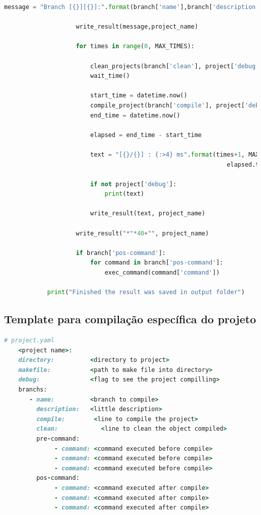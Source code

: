 \begin{apendicesenv}
\begin{lstlisting}[language=Python, caption={Script de Recompilações},
                  label=script_recompilacoes]
                    message = "Branch [{}][{}]:".format(branch['name'],branch['description'])

                    write_result(message,project_name)

                    for times in range(0, MAX_TIMES):

                        clean_projects(branch['clean'], project['debug'])
                        wait_time()

                        start_time = datetime.now()
                        compile_project(branch['compile'], project['debug'])
                        end_time = datetime.now()

                        elapsed = end_time - start_time

                        text = "[{}/{}] : {:>4} ms".format(times+1, MAX_TIMES,
                                                              elapsed.total_seconds())

                        if not project['debug']:
                            print(text)

                        write_result(text, project_name)

                    write_result("*"*40+"", project_name)

                    if branch['pos-command']:
                        for command in branch['pos-command']:
                            exec_command(command['command'])

            print("Finished the result was saved in output folder")
\end{lstlisting}

\subsection{Template para compilação específica do projeto}

\begin{lstlisting}[language=ruby, caption={Template para execução do Script de Recompilações},
                  label=template_para_script_recompilacoes]
	# project.yaml
    <project name>:
    directory:          <directory to project>
    makefile:           <path to make file into directory>
    debug:              <flag to see the project compilling>
    branchs:
       - name:          <branch to compile>
         description:   <little description>
         compile:        <line to compile the project>
         clean:            <line to clean the object compiled>
         pre-command:
              - command: <command executed before compile>
              - command: <command executed before compile>
              - command: <command executed before compile>
         pos-command:
              - command: <command executed after compile>
              - command: <command executed after compile>
              - command: <command executed after compile>
\end{lstlisting}


\end{apendicesenv}
